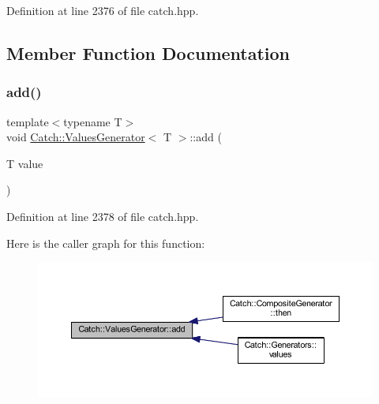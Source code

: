 Definition at line 2376 of file catch.\+hpp.



\subsection{Member Function Documentation}
\hypertarget{class_catch_1_1_values_generator_a8412c8ce5d9d4fc6ff06d5246d56d538}{}\label{class_catch_1_1_values_generator_a8412c8ce5d9d4fc6ff06d5246d56d538} 
\subsubsection{\texorpdfstring{add()}{add()}}
{\footnotesize\ttfamily template$<$typename T$>$ \\
void \hyperlink{class_catch_1_1_values_generator}{Catch\+::\+Values\+Generator}$<$ T $>$\+::add (\begin{DoxyParamCaption}\item[{T}]{value }\end{DoxyParamCaption})\hspace{0.3cm}{\ttfamily [inline]}}



Definition at line 2378 of file catch.\+hpp.

Here is the caller graph for this function\+:\nopagebreak
\begin{figure}[H]
\begin{center}
\leavevmode
\includegraphics[width=350pt]{class_catch_1_1_values_generator_a8412c8ce5d9d4fc6ff06d5246d56d538_icgraph}
\end{center}
\end{figure}
\hypertarget{class_catch_1_1_values_generator_a9674c8b70d562d2d68154de92dd1810a}{}\label{class_catch_1_1_values_generator_a9674c8b70d562d2d68154de92dd1810a} 
